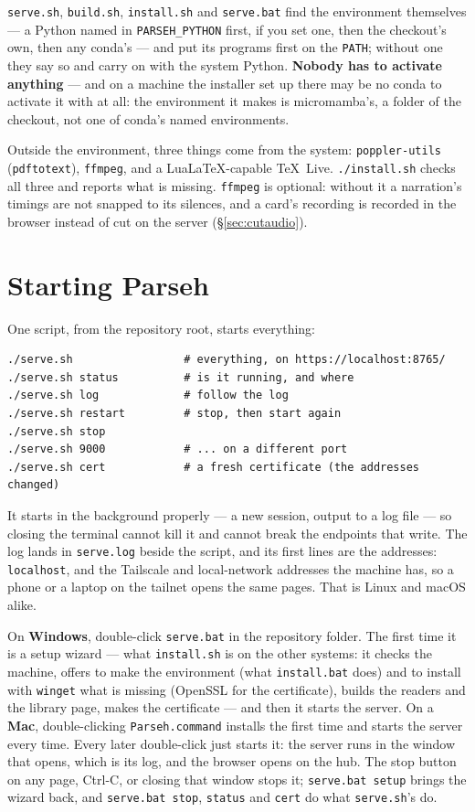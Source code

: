 \documentclass[11pt,oneside]{report}
\newcommand{\file}[1]{\texttt{#1}}
\begin{document}
\file{serve.sh}, \file{build.sh}, \file{install.sh} and \file{serve.bat}
find the environment themselves --- a Python named in
\texttt{PARSEH\_PYTHON} first, if you set one, then the checkout's own, then
any conda's --- and put its programs first on the \texttt{PATH}; without one
they say so and carry on with the system Python. \textbf{Nobody has to
activate anything} --- and on a machine the installer set up there may be no
conda to activate it with at all: the environment it makes is micromamba's,
a folder of the checkout, not one of conda's named environments.

Outside the environment, three things come from the system:
\texttt{poppler-utils} (\texttt{pdftotext}), \texttt{ffmpeg}, and a
LuaLaTeX-capable TeX~Live. \file{./install.sh} checks all three and reports
what is missing. \texttt{ffmpeg} is optional: without it a narration's
timings are not snapped to its silences, and a card's recording is recorded
in the browser instead of cut on the server (\S\ref{sec:cutaudio}).

\section{Starting Parseh}

One script, from the repository root, starts everything:

\begin{lstlisting}
./serve.sh                 # everything, on https://localhost:8765/
./serve.sh status          # is it running, and where
./serve.sh log             # follow the log
./serve.sh restart         # stop, then start again
./serve.sh stop
./serve.sh 9000            # ... on a different port
./serve.sh cert            # a fresh certificate (the addresses changed)
\end{lstlisting}

It starts in the background properly --- a new session, output to a log
file --- so closing the terminal cannot kill it and cannot break the
endpoints that write. The log lands in \file{serve.log} beside the script,
and its first lines are the addresses: \texttt{localhost}, and the Tailscale
and local-network addresses the machine has, so a phone or a laptop on the
tailnet opens the same pages. That is Linux and macOS alike.

On \textbf{Windows}, double-click \file{serve.bat} in the repository
folder. The first time it is a setup wizard --- what \file{install.sh} is on
the other systems: it checks the machine, offers to make the environment
(what \file{install.bat} does) and to install with \texttt{winget} what is
missing (OpenSSL for the certificate), builds the readers and the library
page, makes the certificate --- and then it starts the server. On a
\textbf{Mac}, double-clicking \file{Parseh.command} installs the first time
and starts the server every time. Every later double-click just starts it: the server
runs in the window that opens, which is its log, and the browser opens on
the hub. The stop button on any page, Ctrl-C, or closing that window stops
it; \texttt{serve.bat setup} brings the wizard back, and \texttt{serve.bat
stop}, \texttt{status} and \texttt{cert} do what \file{serve.sh}'s do.
\end{document}

